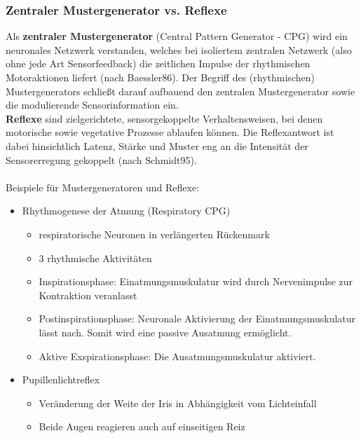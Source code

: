 \subsubsection{Zentraler Mustergenerator vs. Reflexe}
Als \textbf{zentraler Mustergenerator} (Central Pattern Generator - CPG) wird
ein neuronales Netzwerk verstanden, welches bei isoliertem zentralen
Netzwerk (also ohne jede Art Sensorfeedback) die zeitlichen Impulse der
rhythmischen Motoraktionen liefert (nach Baessler86). Der Begriff des
(rhythmischen) Mustergenerators schließt darauf aufbauend den zentralen
Mustergenerator sowie die modulierende Sensorinformation ein.\\
\textbf{Reflexe} sind zielgerichtete, sensorgekoppelte Verhaltensweisen, bei
denen motorische sowie vegetative Prozesse ablaufen können. Die
Reflexantwort ist dabei hinsichtlich Latenz, Stärke und Muster eng an die
Intensität der Sensorerregung gekoppelt (nach Schmidt95).\\ \\
Beispiele für Mustergeneratoren und Reflexe:
\begin{itemize}
\item Rhythmogenese der Atmung (Respiratory CPG)
\begin{itemize}
\item respiratorische Neuronen in verlängerten Rückenmark
\item 3 rhythmische Aktivitäten
\item Inspirationsphase: Einatmungsmuskulatur wird durch Nervenimpulse zur Kontraktion veranlasst
\item Postinspirationsphase: Neuronale Aktivierung der Einatmungsmuskulatur lässt nach. Somit wird eine passive Ausatmung ermöglicht.
\item Aktive Exspirationsphase: Die Ausatmungsmuskulatur aktiviert.
\end{itemize}
\item Pupillenlichtreflex 
\begin{itemize}
\item Veränderung der Weite der Iris in Abhängigkeit vom Lichteinfall
\item Beide Augen reagieren auch auf einseitigen Reiz
\end{itemize}
\end{itemize}
